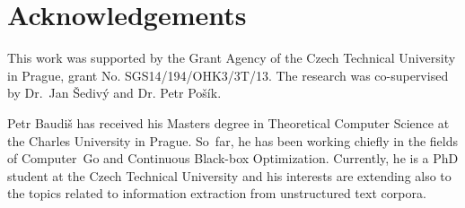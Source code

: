\documentclass{poster15}
\begin{document}
\section*{Acknowledgements}
This work was supported by the Grant Agency of the Czech Technical
University in Prague, grant No. SGS14/\allowbreak{}194/\allowbreak{}OHK3/\allowbreak{}3T/13.
The research was co-supervised by Dr.~Jan Šedivý and Dr. Petr Pošík.








\begin{authorcv}{Petr Baudiš}
	has received his Masters degree in
	Theoretical Computer Science at the Charles University in Prague.
	So~far, he has been working chiefly in the fields of Computer~Go
	and Continuous Black-box Optimization.
	Currently, he is a PhD student at the Czech Technical University
	and his interests are extending also to the topics related to
	information extraction from unstructured text corpora.
\end{authorcv}
\end{document}
